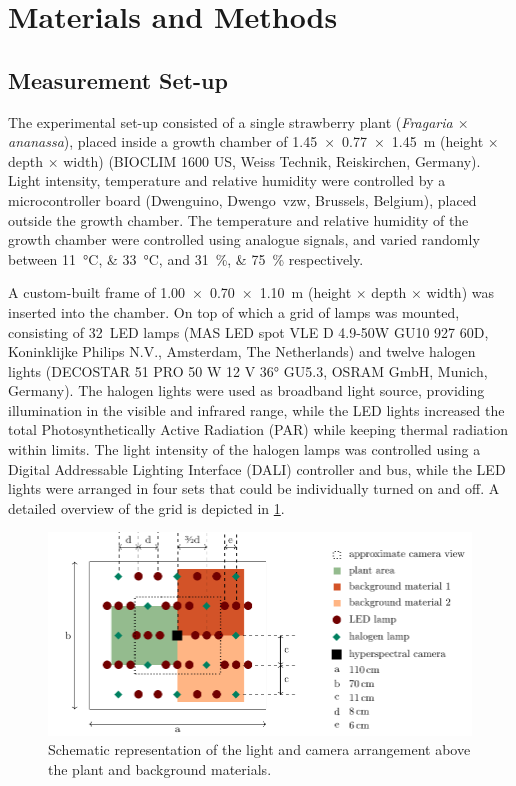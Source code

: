 \section{Materials and Methods}
    
    \subsection{Measurement Set-up}
    
        The experimental set-up consisted of a single strawberry plant (\textit{Fragaria $\times$ ananassa}), placed inside a growth chamber of \SI[product-units = single]{1.45 x 0.77 x 1.45}{\metre} (height $\times$ depth $\times$ width) (BIOCLIM 1600 US, Weiss Technik, Reiskirchen, Germany). Light intensity, temperature and relative humidity were controlled by a microcontroller board (Dwenguino, Dwengo~vzw, Brussels, Belgium), placed outside the growth chamber. The temperature and relative humidity of the growth chamber were controlled using analogue signals, and varied randomly between \SIlist{11;33}{\celsius}, and  \SIlist{31;75}{\percent} respectively.
        
        A custom-built frame of \SI[product-units = single]{1.00 x 0.70 x 1.10}{\metre} (height $\times$ depth $\times$ width) was inserted into the chamber. On top of which a grid of lamps was mounted, consisting of 32~LED lamps (MAS LED spot VLE D 4.9-50W GU10 927 60D, Koninklijke Philips N.V., Amsterdam, The Netherlands) and twelve halogen lights (DECOSTAR 51 PRO 50 W 12 V \ang{36} GU5.3, OSRAM GmbH, Munich, Germany). The halogen lights were used as broadband light source, providing illumination in the visible and infrared range, while the LED lights increased the total Photosynthetically Active Radiation (PAR) while keeping thermal radiation within limits. The light intensity of the halogen lamps was controlled using a Digital Addressable Lighting Interface (DALI) controller and bus, while the LED lights were arranged in four sets that could be individually turned on and off. A detailed overview of the grid is depicted in \cref{lamp-configuration}.
        
        \begin{figure}[thb]
            \centering
            \includegraphics{figures/lamp-layout}
            \caption{Schematic representation of the light and camera arrangement above the plant and background materials.}
            \label{lamp-configuration}
        \end{figure}
        
